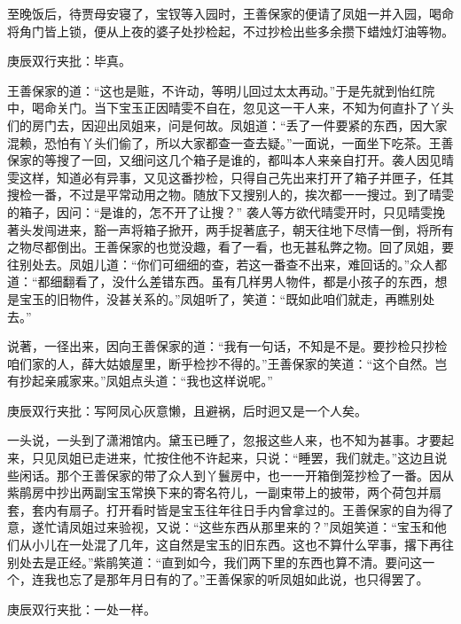 \begin{parag}


    至晚饭后，待贾母安寝了，宝钗等入园时，王善保家的便请了凤姐一并入园，喝命将角门皆上锁，便从上夜的婆子处抄检起，不过抄检出些多余攒下蜡烛灯油等物。\begin{note}庚辰双行夹批：毕真。\end{note}王善保家的道：“这也是赃，不许动，等明儿回过太太再动。”于是先就到怡红院中，喝命关门。当下宝玉正因晴雯不自在，忽见这一干人来，不知为何直扑了丫头们的房门去，因迎出凤姐来，问是何故。凤姐道：“丢了一件要紧的东西，因大家混赖，恐怕有丫头们偷了，所以大家都查一查去疑。”一面说，一面坐下吃茶。王善保家的等搜了一回，又细问这几个箱子是谁的，都叫本人来亲自打开。袭人因见晴雯这样，知道必有异事，又见这番抄检，只得自己先出来打开了箱子并匣子，任其搜检一番，不过是平常动用之物。随放下又搜别人的，挨次都一一搜过。到了晴雯的箱子，因问：“是谁的，怎不开了让搜？” 袭人等方欲代晴雯开时，只见晴雯挽著头发闯进来，豁一声将箱子掀开，两手捉著底子，朝天往地下尽情一倒，将所有之物尽都倒出。王善保家的也觉没趣，看了一看，也无甚私弊之物。回了凤姐，要往别处去。凤姐儿道：“你们可细细的查，若这一番查不出来，难回话的。”众人都道：“都细翻看了，没什么差错东西。虽有几样男人物件，都是小孩子的东西，想是宝玉的旧物件，没甚关系的。”凤姐听了，笑道：“既如此咱们就走，再瞧别处去。”
\end{parag}


\begin{parag}


    说著，一径出来，因向王善保家的道：“我有一句话，不知是不是。要抄检只抄检咱们家的人，薛大姑娘屋里，断乎检抄不得的。”王善保家的笑道：“这个自然。岂有抄起亲戚家来。”凤姐点头道：“我也这样说呢。”\begin{note}庚辰双行夹批：写阿凤心灰意懒，且避祸，后时迥又是一个人矣。\end{note}一头说，一头到了潇湘馆内。黛玉已睡了，忽报这些人来，也不知为甚事。才要起来，只见凤姐已走进来，忙按住他不许起来，只说：“睡罢，我们就走。”这边且说些闲话。那个王善保家的带了众人到丫鬟房中，也一一开箱倒笼抄检了一番。因从紫鹃房中抄出两副宝玉常换下来的寄名符儿，一副束带上的披带，两个荷包并扇套，套内有扇子。打开看时皆是宝玉往年往日手内曾拿过的。王善保家的自为得了意，遂忙请凤姐过来验视，又说：“这些东西从那里来的？”凤姐笑道：“宝玉和他们从小儿在一处混了几年，这自然是宝玉的旧东西。这也不算什么罕事，撂下再往别处去是正经。”紫鹃笑道：“直到如今，我们两下里的东西也算不清。要问这一个，连我也忘了是那年月日有的了。”王善保家的听凤姐如此说，也只得罢了。\begin{note}庚辰双行夹批：一处一样。\end{note}
\end{parag}


